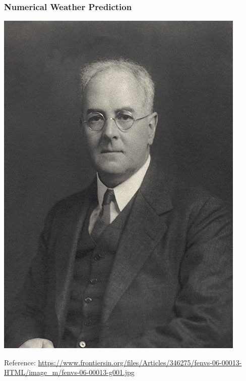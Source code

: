 %
%
%

\begin{frame}
  \frametitle{Numerical Weather Prediction}
  \begin{center}
      \includegraphics[height=0.7\textheight]{slides/images/frz.jpg}
  \end{center}
  Reference: \tiny \url{https://www.frontiersin.org/files/Articles/346275/fenvs-06-00013-HTML/image_m/fenvs-06-00013-g001.jpg}
  \end{frame}
